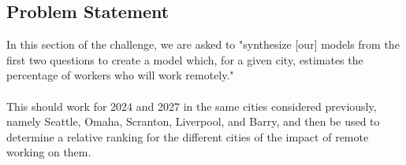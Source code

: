    
    
        \subsection{Problem Statement}
        In this section of the challenge, we are asked to "synthesize [our] models from the first two questions to create a model which, for a given city, estimates the percentage of workers who will work remotely." \\ \\
        This should work for 2024 and 2027 in the same cities considered previously, namely  Seattle, Omaha, Scranton, Liverpool, and Barry, and then be used to determine a relative ranking for the different cities of the impact of remote working on them. 
        
